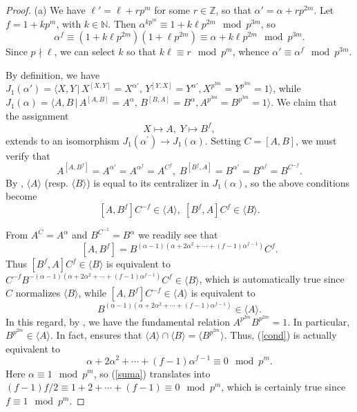 \documentclass{amsart}
\theoremstyle{definition}
\theoremstyle{remark}
\newcommand \Z{{\mathbb Z}}
\newcommand \N{{\mathbb N}}
\begin{document}
\begin{proof} (a) We have $\ell'=\ell+rp^m$ for some $r\in\Z$, so that $\alpha'=\alpha+rp^{2m}$.
Let $f=1+kp^m$, with $k\in\N$. Then $\alpha^{kp^m} \equiv 1+k\ell p^{2m}\mod p^{3m}$,
so
$$
\alpha^f \equiv (1+k\ell p^{2m})(1+\ell p^{2m})\equiv \alpha+ k\ell p^{2m}\mod p^{3m}.
$$
Since $p\nmid \ell$, we can select $k$ so that $k\ell\equiv r\mod p^m$, whence $\alpha'\equiv\alpha^f\mod p^{3m}$.

By definition, we have $J_1(\alpha')=\langle X,Y\,|\, X^{[X,Y]}=X^{\alpha'},\, Y^{[Y,X]}=Y^{\alpha'}, X ^{p^{3m}}=Y^{p^{3m}}=1\rangle$,
while $J_1(\alpha)=\langle A,B\,|\, A^{[A,B]}=A^{\alpha},\, B^{[B,A]}=B^{\alpha}, A^{p^{3m}}=B^{p^{3m}}=1\rangle.$
We claim that the assignment
\begin{equation}
\label{iso}
X\mapsto A,\; Y\mapsto B^f,
\end{equation}
extends to an isomorphism $J_1(\alpha^\prime)\to J_1(\alpha)$.
Setting $C=[A,B]$, we must verify that
$$
A^{[A,B^f]}=A^{\alpha'}=A^{\alpha^f}=A^{C^f},\; B^{[B^f,A]}=B^{\alpha'}=B^{\alpha^f}=B^{C^{-f}}.
$$
By \cite[Proposition 7.3]{MS}, $\langle A\rangle$ (resp. $\langle B\rangle$) is equal to its centralizer in $J_1(\alpha)$,
so the above conditions become
$$
[A,B^f]C^{-f}\in \langle A\rangle,\; [B^f,A]C^{f}\in \langle B\rangle.
$$

From $A^C=A^\alpha$ and $B^{C^{-1}}=B^\alpha$ we readily see that
$$
[A,B^f]=B^{(\alpha-1)(\alpha+2\alpha^2+\cdots+(f-1)\alpha^{f-1})} C^f.
$$
Thus $[B^f,A]C^{f}\in \langle B\rangle$ is equivalent to $C^{-f}B^{-(\alpha-1)(\alpha+2\alpha^2+\cdots+(f-1)\alpha^{f-1})} C^{f}\in
\langle B\rangle$, which is automatically true since $C$ normalizes $\langle B\rangle$, while
$[A,B^f]C^{-f}\in \langle A\rangle$ is equivalent to
\begin{equation}
\label{cond}
B^{(\alpha-1)(\alpha+2\alpha^2+\cdots+(f-1)\alpha^{f-1})}\in
\langle A\rangle.
\end{equation}
In this regard,  by \cite[Section 6]{MS}, we have the fundamental relation $A^{p^{2m}}B^{p^{2m}}=1$. In particular,
$B^{p^{2m}}\in \langle A\rangle$. In fact, \cite[Proposition 7.2]{MS} ensures that
$\langle A\rangle\cap \langle B\rangle= \langle B^{p^{2m}} \rangle$.
Thus, (\ref{cond}) is actually equivalent to
\begin{equation}
\label{suma}
\alpha+2\alpha^2+\cdots+(f-1)\alpha^{f-1}\equiv 0\mod p^m.
\end{equation}
Here $\alpha\equiv 1\mod p^m$, so (\ref{suma}) translates into $(f-1)f/2\equiv 1+2+\cdots+(f-1)\equiv 0\mod p^m$,
which is certainly true since $f\equiv 1\mod p^m$.


\end{proof}
\end{document}
